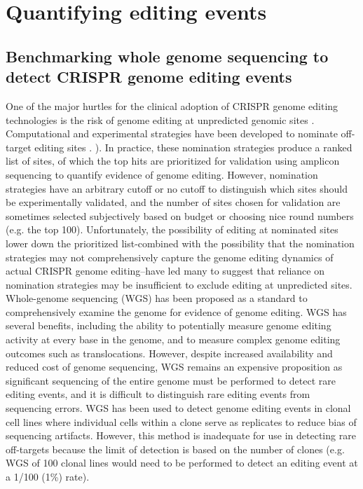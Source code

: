 \documentclass[a4paper, titlepage, openright]{book}
\newcommand{\mychapter}[2]{
    \setcounter{chapter}{#1}
    \setcounter{section}{0}
    \chapter*{#2}
    \addcontentsline{toc}{chapter}{#2}
}
\begin{document}
\mychapter{8}{Quantifying editing events}

\section{Benchmarking whole genome sequencing to detect CRISPR genome editing events}
One of the major hurtles for the clinical adoption of CRISPR genome editing technologies is the risk of genome editing at unpredicted genomic sites \citep{fu2013high}. Computational and experimental strategies have been developed to nominate off-target editing sites \citep{clement2020technologies}. ). In practice, these nomination strategies produce a ranked list of sites, of which the top hits are prioritized for validation using amplicon sequencing to quantify evidence of genome editing\citep{akcakaya2018vivo}. However, nomination strategies have an arbitrary cutoff or no cutoff to distinguish which sites should be experimentally validated, and the number of sites chosen for validation are sometimes selected subjectively based on budget or choosing nice round numbers (e.g. the top 100). Unfortunately, the possibility of editing at nominated sites lower down the prioritized list-combined with the possibility that the nomination strategies may not comprehensively capture the genome editing dynamics of actual CRISPR genome editing–have led many to suggest that reliance on nomination strategies may be insufficient to exclude editing at unpredicted sites.  Whole-genome sequencing (WGS) has been proposed as a standard to comprehensively examine the genome for evidence of genome editing. WGS has several benefits, including the ability to potentially measure genome editing activity at every base in the genome, and to measure complex genome editing outcomes such as translocations. However, despite increased availability and reduced cost of genome sequencing, WGS remains an expensive proposition as significant sequencing of the entire genome must be performed to detect rare editing events, and it is difficult to distinguish rare editing events from sequencing errors. WGS has been used to detect genome editing events in clonal cell lines \citep{smith2014whole, veres2014low} where individual cells within a clone serve as replicates to reduce bias of sequencing artifacts. However, this method is inadequate for use in detecting rare off-targets because the limit of detection is based on the number of clones (e.g. WGS of 100 clonal lines would need to be performed to detect an editing event at a 1/100 (1\%) rate). 
\end{document}
